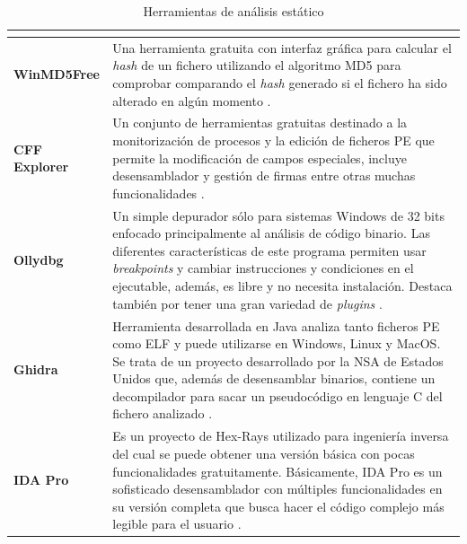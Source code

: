 \begin{table}[htb!]
\centering
\scriptsize %
\caption{Herramientas de análisis estático}
\begin{tabular}{|l|p{12cm}|}
\hline
\rowcolor[HTML]{C0C0C0}
\multicolumn{1}{|c|}{\cellcolor[HTML]{C0C0C0}{\textbf{Herramienta}}} & \multicolumn{1}{c|}{\cellcolor[HTML]{C0C0C0}{\color[HTML]{000000} \textbf{Descripción}}}\\ \hline

    \textbf{WinMD5Free}& Una herramienta gratuita con interfaz gráfica para calcular el \textit{hash} de un fichero utilizando el algoritmo \gls{MD5} para comprobar comparando el \textit{hash} generado si el fichero ha sido alterado en algún momento \cite{EPN2014}.\\ \hline
    
    \textbf{CFF Explorer}& Un conjunto de herramientas gratuitas destinado a la monitorización de procesos y la edición de ficheros \gls{PE} que permite la modificación de campos especiales, incluye desensamblador y gestión de firmas entre otras muchas funcionalidades \cite{EPN2014}.\\ \hline

    \textbf{Ollydbg}& Un simple depurador sólo para sistemas Windows de 32 bits enfocado principalmente al análisis de código binario. Las diferentes características de este programa permiten usar \textit{breakpoints} y cambiar instrucciones y condiciones en el ejecutable, además, es libre y no necesita instalación. Destaca también por tener una gran variedad de \textit{plugins} \cite{Vokorokos2017}.\\ \hline
    
    \textbf{Ghidra}&Herramienta desarrollada en Java analiza tanto ficheros \gls{PE} como \gls{ELF} y puede utilizarse en Windows, Linux y MacOS. Se trata de un proyecto desarrollado por la \gls{NSA} de Estados Unidos que, además de desensamblar binarios, contiene un decompilador para sacar un pseudocódigo en lenguaje C del fichero analizado \cite{SIM2020}.\\ \hline
    
    \textbf{IDA Pro}& Es un proyecto de Hex-Rays utilizado para ingeniería inversa del cual se puede obtener una versión básica con pocas funcionalidades gratuitamente. Básicamente, \gls{IDA} Pro es un sofisticado desensamblador con múltiples funcionalidades en su versión completa que busca hacer el código complejo más legible para el usuario \cite{IDA2011}.\\ \hline
    

\end{tabular}
\end{table}
